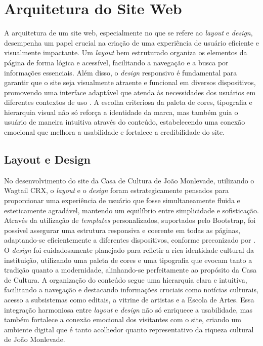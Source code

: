 \section{Arquitetura do Site Web}

A arquitetura de um site web, especialmente no que se refere ao \textit{layout} e \textit{design}, desempenha um papel crucial na criação de uma experiência de usuário eficiente e visualmente impactante. Um \textit{layout} bem estruturado organiza os elementos da página de forma lógica e acessível, facilitando a navegação e a busca por informações essenciais. Além disso, o \textit{design} responsivo é fundamental para garantir que o site seja visualmente atraente e funcional em diversos dispositivos, promovendo uma interface adaptável que atenda às necessidades dos usuários em diferentes contextos de uso \cite{garrett2010elements}. A escolha criteriosa da paleta de cores, tipografia e hierarquia visual não só reforça a identidade da marca, mas também guia o usuário de maneira intuitiva através do conteúdo, estabelecendo uma conexão emocional que melhora a usabilidade e fortalece a credibilidade do site.

\subsection{Layout e Design}

No desenvolvimento do site da Casa de Cultura de João Monlevade, utilizando o Wagtail CRX, o \textit{layout} e o \textit{design} foram estrategicamente pensados para proporcionar uma experiência de usuário que fosse simultaneamente fluida e esteticamente agradável, mantendo um equilíbrio entre simplicidade e sofisticação. Através da utilização de \textit{templates} personalizados, suportados pelo Bootstrap, foi possível assegurar uma estrutura responsiva e coerente em todas as páginas, adaptando-se eficientemente a diferentes dispositivos, conforme preconizado por . O \textit{design} foi cuidadosamente planejado para refletir a rica identidade cultural da instituição, utilizando uma paleta de cores e uma tipografia que evocam tanto a tradição quanto a modernidade, alinhando-se perfeitamente ao propósito da Casa de Cultura. A organização do conteúdo segue uma hierarquia clara e intuitiva, facilitando a navegação e destacando informações cruciais como notícias culturais, acesso a subsistemas como editais, a vitrine de artistas e a Escola de Artes. Essa integração harmoniosa entre \textit{layout} e \textit{design} não só enriquece a usabilidade, mas também fortalece a conexão emocional dos visitantes com o site, criando um ambiente digital que é tanto acolhedor quanto representativo da riqueza cultural de João Monlevade.

